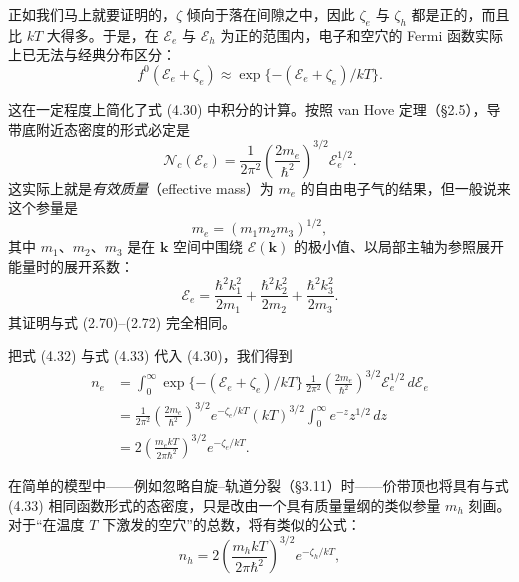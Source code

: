 正如我们马上就要证明的，$\zeta$ 倾向于落在间隙之中，因此 $\zeta_e$ 与 $\zeta_h$ 都是正的，而且比 $kT$ 大得多。于是，在 $\mathcal{E}_e$ 与 $\mathcal{E}_h$ 为正的范围内，电子和空穴的 Fermi 函数实际上已无法与经典分布区分：
\begin{equation*}
f^0(\mathcal{E}_e+\zeta_e) \approx \exp\{-(\mathcal{E}_e+\zeta_e)/kT\}.
\tag{4.32}
\end{equation*}


这在一定程度上简化了式 (4.30) 中积分的计算。按照 van Hove 定理（§2.5），导带底附近态密度的形式必定是
\begin{equation*}
\mathcal{N}_c(\mathcal{E}_e) = \frac{1}{2\pi^2}\left(\frac{2m_e}{\hbar^2}\right)^{3/2}\mathcal{E}_e^{1/2}.
\tag{4.33}
\end{equation*}
这实际上就是\emph{有效质量}（effective mass）为 $m_e$ 的自由电子气的结果，但一般说来这个参量是
\begin{equation*}
m_e = (m_1 m_2 m_3)^{1/2},
\tag{4.34}
\end{equation*}
其中 $m_1$、$m_2$、$m_3$ 是在 $\mathbf{k}$ 空间中围绕 $\mathcal{E}(\mathbf{k})$ 的极小值、以局部主轴为参照展开能量时的展开系数：
\begin{equation*}
\mathcal{E}_e = \frac{\hbar^2 k_1^2}{2m_1} + \frac{\hbar^2 k_2^2}{2m_2} + \frac{\hbar^2 k_3^2}{2m_3}.
\tag{4.35}
\end{equation*}
其证明与式 (2.70)–(2.72) 完全相同。

把式 (4.32) 与式 (4.33) 代入 (4.30)，我们得到
\begin{align*}
n_e &= \int_0^{\infty} \exp\{-(\mathcal{E}_e+\zeta_e)/kT\}\,\frac{1}{2\pi^2}\left(\frac{2m_e}{\hbar^2}\right)^{3/2}\mathcal{E}_e^{1/2}\,d\mathcal{E}_e \\
&= \frac{1}{2\pi^2}\left(\frac{2m_e}{\hbar^2}\right)^{3/2} e^{-\zeta_e/kT}(kT)^{3/2}\int_0^{\infty} e^{-z}z^{1/2}\,dz \\
&= 2\left(\frac{m_e kT}{2\pi\hbar^2}\right)^{3/2} e^{-\zeta_e/kT}.
\tag{4.36}
\end{align*}

在简单的模型中——例如忽略自旋–轨道分裂（§3.11）时——价带顶也将具有与式 (4.33) 相同函数形式的态密度，只是改由一个具有质量量纲的类似参量 $m_h$ 刻画。对于“在温度 $T$ 下激发的空穴”的总数，将有类似的公式：
\begin{equation*}
n_h = 2\left(\frac{m_h kT}{2\pi\hbar^2}\right)^{3/2} e^{-\zeta_h/kT},
\tag{4.37}
\end{equation*}

